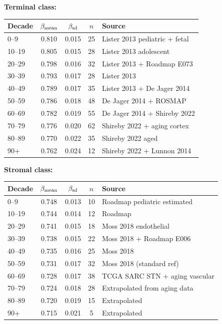 \documentclass[12pt,a4paper]{article}
\begin{document}
\textbf{Terminal class:}

\begin{center}
\footnotesize
\begin{tabular}{lcccp{4cm}}
\toprule
Decade & $\beta_{\rm mean}$ & $\beta_{\rm sd}$ & $n$ & Source \\
\midrule
0--9   & 0.810 & 0.015 & 25 & Lister 2013 pediatric + fetal \\
10--19 & 0.805 & 0.015 & 28 & Lister 2013 adolescent \\
20--29 & 0.798 & 0.016 & 32 & Lister 2013 + Roadmap E073 \\
30--39 & 0.793 & 0.017 & 28 & Lister 2013 \\
40--49 & 0.789 & 0.017 & 35 & Lister 2013 + De Jager 2014 \\
50--59 & 0.786 & 0.018 & 48 & De Jager 2014 + ROSMAP \\
60--69 & 0.782 & 0.019 & 55 & De Jager 2014 + Shireby 2022 \\
70--79 & 0.776 & 0.020 & 62 & Shireby 2022 + aging cortex \\
80--89 & 0.770 & 0.022 & 35 & Shireby 2022 aged \\
90+    & 0.762 & 0.024 & 12 & Shireby 2022 + Lunnon 2014 \\
\bottomrule
\end{tabular}
\end{center}

\textbf{Stromal class:}

\begin{center}
\footnotesize
\begin{tabular}{lcccp{4cm}}
\toprule
Decade & $\beta_{\rm mean}$ & $\beta_{\rm sd}$ & $n$ & Source \\
\midrule
0--9   & 0.748 & 0.013 & 10 & Roadmap pediatric estimated \\
10--19 & 0.744 & 0.014 & 12 & Roadmap \\
20--29 & 0.741 & 0.015 & 18 & Moss 2018 endothelial \\
30--39 & 0.738 & 0.015 & 22 & Moss 2018 + Roadmap E006 \\
40--49 & 0.735 & 0.016 & 25 & Moss 2018 \\
50--59 & 0.731 & 0.017 & 32 & Moss 2018 (standard ref) \\
60--69 & 0.728 & 0.017 & 38 & TCGA SARC STN + aging vascular \\
70--79 & 0.724 & 0.018 & 28 & Extrapolated from aging data \\
80--89 & 0.720 & 0.019 & 15 & Extrapolated \\
90+    & 0.715 & 0.021 &  5 & Extrapolated \\
\bottomrule
\end{tabular}
\end{center}
\end{document}
